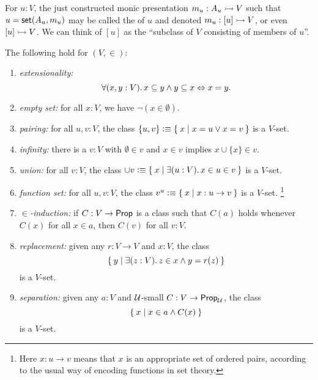 \documentclass[hott-all.tex]{subfiles}
\begin{document}
% 
\begin{defn}
  For $u:V$, the just constructed monic presentation $m_u: A_u \rightarrowtail V$ such that $u = \mathsf{set}(A_u, m_u)$ may be called the 
  of $u$ and denoted $m_u : [u] \rightarrowtail V$, or even $[u] \rightarrowtail V$.  We can think of $[u]$ as the ``subclass of $V$ consisting of members of $u$''.
\end{defn}
% 
\begin{thm}
  The following hold for $(V, {\in})$:
  \begin{enumerate}
  \item \emph{extensionality:}
    \begin{equation*}
      \fall{x, y : V} x \subseteq y \land y \subseteq x \Leftrightarrow x = y.
    \end{equation*}
     \item \emph{empty set:} for all $x:V$, we have $\neg (x\in \emptyset)$.
    \item \emph{pairing:} for all $u, v:V$, the class $\{u, v\} \vcentcolon\equiv \Set{ x | x = u \vee x = v}$ is a $V$-set.
    \item \emph{infinity:}  there is a $v:V$ with $\emptyset\in v$ and $x\in v$ implies $x\cup \{x\}\in v$.
  \item \emph{union:} for all $v:V$, the class $\cup v\defeq \setof{ x | \exis{u:V} x \in u \in v}$ is a $V$-set.
    \item \emph{function set:} for all $u, v:V$, the class $v^u \vcentcolon\equiv \Set{ x | x : u\to v}$ is a $V$-set.%
      \footnote{Here $x:u\to v$ means that $x$ is an appropriate set of ordered pairs, according to the usual way of encoding functions in set theory.}
   \item \emph{$\in$-induction:} if $C : V \to \mathsf{Prop}$ is a class such that $C(a)$ holds whenever $C(x)$ for all $x\in a$, then $C(v)$ for all $v:V$.
     \item \emph{replacement:} given any $r : V \to V$ and $x : V$, the class
       \begin{equation*}
         \setof{ y | \exis{z : V} z \in x \land y = r(z)}
       \end{equation*}
       is a $V$-set.
   \item \emph{separation:}  given any $a : V$ and $\mathcal{U}$-small $C : V \to \mathsf{Prop}_\mathcal{U}$, the class
     \begin{equation*}
       \Set{ x | x \in a \land C(x)}
     \end{equation*}
     is a $V$-set.
  \end{enumerate}
\end{thm}
\end{document}
